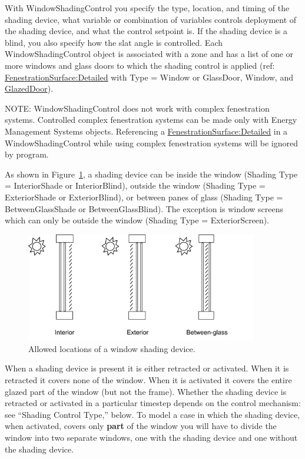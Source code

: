 With WindowShadingControl you specify the type,  location, and timing of the shading device, what variable or combination of variables controls deployment of the shading device, and what the control setpoint is. If the shading device is a blind, you also specify how the slat angle is controlled. Each WindowShadingControl object is associated with a zone and has a list of one or more windows and glass doors to which the shading control is applied (ref: \hyperref[fenestrationsurfacedetailed]{FenestrationSurface:Detailed} with Type = Window or GlassDoor, Window, and \hyperref[glazeddoor]{GlazedDoor}).

NOTE: WindowShadingControl does not work with complex fenestration systems. Controlled complex fenestration systems can be made only with Energy Management Systems objects. Referencing a \hyperref[fenestrationsurfacedetailed]{FenestrationSurface:Detailed} in a WindowShadingControl while using complex fenestration systems will be ignored by program.

As shown in Figure~\ref{fig:allowed-locations-of-a-window-shading-device.}, a shading device can be inside the window (Shading Type = InteriorShade or InteriorBlind), outside the window (Shading Type = ExteriorShade or ExteriorBlind), or between panes of glass (Shading Type = BetweenGlassShade or BetweenGlassBlind). The exception is window screens which can only be outside the window (Shading Type = ExteriorScreen).

\begin{figure}[hbtp] %
\centering
\includegraphics[width=0.9\textwidth, height=0.9\textheight, keepaspectratio=true]{media/image060.png}
\caption{Allowed locations of a window shading device. \protect \label{fig:allowed-locations-of-a-window-shading-device.}}
\end{figure}

When a shading device is present it is either retracted or activated. When it is retracted it covers none of the window. When it is activated it covers the entire glazed part of the window (but not the frame). Whether the shading device is retracted or activated in a particular timestep depends on the control mechanism: see ``Shading Control Type,'' below. To model a case in which the shading device, when activated, covers only \textbf{part} of the window you will have to divide the window into two separate windows, one with the shading device and one without the shading device.

